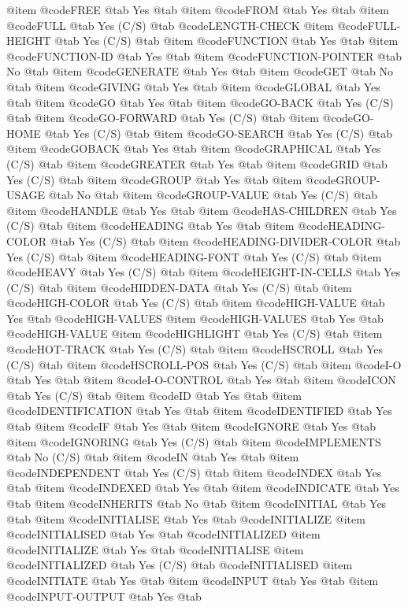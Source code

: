 @item @code{FREE} @tab Yes @tab 
@item @code{FROM} @tab Yes @tab 
@item @code{FULL} @tab Yes	(C/S) @tab @code{LENGTH-CHECK}
@item @code{FULL-HEIGHT} @tab Yes	(C/S) @tab 
@item @code{FUNCTION} @tab Yes @tab 
@item @code{FUNCTION-ID} @tab Yes @tab 
@item @code{FUNCTION-POINTER} @tab No @tab 
@item @code{GENERATE} @tab Yes @tab 
@item @code{GET} @tab No @tab 
@item @code{GIVING} @tab Yes @tab 
@item @code{GLOBAL} @tab Yes @tab 
@item @code{GO} @tab Yes @tab 
@item @code{GO-BACK} @tab Yes	(C/S) @tab 
@item @code{GO-FORWARD} @tab Yes	(C/S) @tab 
@item @code{GO-HOME} @tab Yes	(C/S) @tab 
@item @code{GO-SEARCH} @tab Yes	(C/S) @tab 
@item @code{GOBACK} @tab Yes @tab 
@item @code{GRAPHICAL} @tab Yes	(C/S) @tab 
@item @code{GREATER} @tab Yes @tab 
@item @code{GRID} @tab Yes	(C/S) @tab 
@item @code{GROUP} @tab Yes @tab 
@item @code{GROUP-USAGE} @tab No @tab 
@item @code{GROUP-VALUE} @tab Yes	(C/S) @tab 
@item @code{HANDLE} @tab Yes @tab 
@item @code{HAS-CHILDREN} @tab Yes	(C/S) @tab 
@item @code{HEADING} @tab Yes @tab 
@item @code{HEADING-COLOR} @tab Yes	(C/S) @tab 
@item @code{HEADING-DIVIDER-COLOR} @tab Yes	(C/S) @tab 
@item @code{HEADING-FONT} @tab Yes	(C/S) @tab 
@item @code{HEAVY} @tab Yes	(C/S) @tab 
@item @code{HEIGHT-IN-CELLS} @tab Yes	(C/S) @tab 
@item @code{HIDDEN-DATA} @tab Yes	(C/S) @tab 
@item @code{HIGH-COLOR} @tab Yes	(C/S) @tab 
@item @code{HIGH-VALUE} @tab Yes @tab @code{HIGH-VALUES}
@item @code{HIGH-VALUES} @tab Yes @tab @code{HIGH-VALUE}
@item @code{HIGHLIGHT} @tab Yes	(C/S) @tab 
@item @code{HOT-TRACK} @tab Yes	(C/S) @tab 
@item @code{HSCROLL} @tab Yes	(C/S) @tab 
@item @code{HSCROLL-POS} @tab Yes	(C/S) @tab 
@item @code{I-O} @tab Yes @tab 
@item @code{I-O-CONTROL} @tab Yes @tab 
@item @code{ICON} @tab Yes	(C/S) @tab 
@item @code{ID} @tab Yes @tab 
@item @code{IDENTIFICATION} @tab Yes @tab 
@item @code{IDENTIFIED} @tab Yes @tab 
@item @code{IF} @tab Yes @tab 
@item @code{IGNORE} @tab Yes @tab 
@item @code{IGNORING} @tab Yes	(C/S) @tab 
@item @code{IMPLEMENTS} @tab No	(C/S) @tab 
@item @code{IN} @tab Yes @tab 
@item @code{INDEPENDENT} @tab Yes	(C/S) @tab 
@item @code{INDEX} @tab Yes @tab 
@item @code{INDEXED} @tab Yes @tab 
@item @code{INDICATE} @tab Yes @tab 
@item @code{INHERITS} @tab No @tab 
@item @code{INITIAL} @tab Yes @tab 
@item @code{INITIALISE} @tab Yes @tab @code{INITIALIZE}
@item @code{INITIALISED} @tab Yes @tab @code{INITIALIZED}
@item @code{INITIALIZE} @tab Yes @tab @code{INITIALISE}
@item @code{INITIALIZED} @tab Yes	(C/S) @tab @code{INITIALISED}
@item @code{INITIATE} @tab Yes @tab 
@item @code{INPUT} @tab Yes @tab 
@item @code{INPUT-OUTPUT} @tab Yes @tab 
